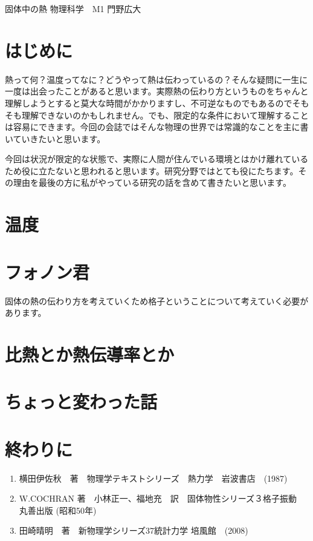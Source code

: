 \documentclass[10pt,b5paper,papersize,dvipdfmx]{jsbook}
\begin{document}

\kaishititle%
  {固体中の熱}%
  {物理科学　M1}%
  {門野広大}%


\section*{はじめに}
熱って何？温度ってなに？どうやって熱は伝わっているの？そんな疑問に一生に一度は出会ったことがあると思います。実際熱の伝わり方というものをちゃんと理解しようとすると莫大な時間がかかりますし、不可逆なものでもあるのでそもそも理解できないのかもしれません。でも、限定的な条件において理解することは容易にできます。今回の会誌ではそんな物理の世界では常識的なことを主に書いていきたいと思います。\par
今回は状況が限定的な状態で、実際に人間が住んでいる環境とはかけ離れているため役に立たないと思われると思います。研究分野ではとても役にたちます。その理由を最後の方に私がやっている研究の話を含めて書きたいと思います。


%
\section{温度}



\section{フォノン君}
固体の熱の伝わり方を考えていくため格子ということについて考えていく必要があります。


\section{比熱とか熱伝導率とか}

\section{ちょっと変わった話}

\section{終わりに}

\begin{sanko}
  \begin{enumerate}
    \item 横田伊佐秋　著　物理学テキストシリーズ　熱力学　岩波書店　(1987)
    \item W.COCHRAN 著　小林正一、福地充　訳　固体物性シリーズ３格子振動　丸善出版 (昭和50年)
    \item 田崎晴明　著　新物理学シリーズ37統計力学 培風館　(2008)
  \end{enumerate}
\end{sanko}
\end{document}
